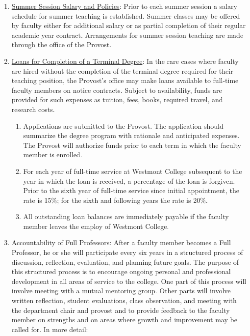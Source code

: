 \begin{enumerate}[label=\alph*)]
				\item{\underline{ Summer Session Salary and Policies}:  Prior to each summer
					session a salary schedule for summer teaching is established.  Summer
					classes may be offered by faculty either for additional salary or as partial
					completion of their regular academic year contract. Arrangements for summer
					session teaching are made through the office of the Provost. }

				\item{\underline{ Loans for Completion of a Terminal Degree}:  In the rare
					cases where faculty are hired without the completion of the terminal degree
					required for their teaching position, the Provost's office may make loans
					available to full-time faculty members on notice contracts. Subject to
					availability, funds are provided for such expenses as tuition, fees, books,
					required travel, and research costs.

					\begin{enumerate}[label=\arabic*)]

						\item{ Applications are submitted to the Provost.  The
							application should summarize the degree program with
							rationale and anticipated expenses.  The Provost will
							authorize funds prior to each term in which the faculty
							member is enrolled. }

						\item{ For each year of full-time service at Westmont
							College subsequent to the year in which the loan is
							received, a percentage of the loan is forgiven.  Prior to
							the sixth year of full-time service since initial
							appointment, the rate is 15\%; for the sixth and following
							years the rate is 20\%. }

						\item{ All outstanding loan balances are immediately payable
							if the faculty member leaves the employ of Westmont College.}

					\end{enumerate}
				}

				\item{Accountability of Full Professors:  After a faculty member becomes a
					Full Professor, he or she will participate every six years in a structured
					process of discussion, reflection, evaluation, and planning future goals. The
					purpose of this structured process is to encourage ongoing personal and
					professional development in all areas of service to the college. One part of
					this process will involve meeting with a mutual mentoring group. Other parts
					will involve written reflection, student evaluations, class observation, and
					meeting with the department chair and provost and to provide feedback to the
					faculty member on strengths and on areas where growth and improvement may be
					called for. In more detail:

}
\end{enumerate}
